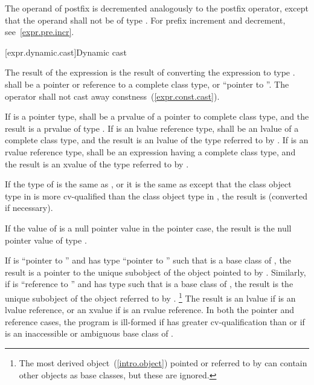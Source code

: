 \pnum
{}%
%
%
%
The operand of postfix \tcode{\dcr} is decremented analogously to the
postfix \tcode{++} operator, except that the operand shall not be of
type .
\enternote 
For prefix increment and decrement, see~\ref{expr.pre.incr}.
\exitnote 

[expr.dynamic.cast]{Dynamic cast}

\pnum
{}%
%
The result of the expression  is the result of
converting the expression  to type .
%
 shall be a pointer or reference to a complete class type, or
``pointer to  ''. The  operator shall not cast
away constness~(\ref{expr.const.cast}).

\pnum
If  is a pointer type,  shall be a prvalue of a
pointer to complete class type, and the result is a prvalue of type
. If  is an lvalue reference type,  shall be
an lvalue of a complete class type, and the result is an lvalue of the
type referred to by . If  is an rvalue reference type,
 shall be an expression having a complete class type, and the
result is an xvalue of the type referred to by .

\pnum
If the type of  is the same as , or it is
the same as  except that the class object type in  is
more cv-qualified than the class object type in , the result is
 (converted if necessary).

\pnum
If the value of  is a null pointer value in the pointer case,
the result is the null pointer value of type .

\pnum
If  is ``pointer to  '' and  has
type ``pointer to  '' such that  is a base
class of , the result is a pointer to the unique 
subobject of the  object pointed to by . Similarly, if
 is ``reference to  '' and  has
type   such that  is a base class of
, the result is the unique  subobject of the 
object referred to by .
\footnote{The most derived object~(\ref{intro.object}) pointed or referred to by
 can contain other  objects as base classes, but these
are ignored.}
The result is an lvalue if  is an lvalue reference, or an
xvalue if  is an rvalue reference. In both the pointer and
reference cases, the program is ill-formed if  has greater
cv-qualification than  or if  is an inaccessible or
ambiguous base class of .
\enterexample 


